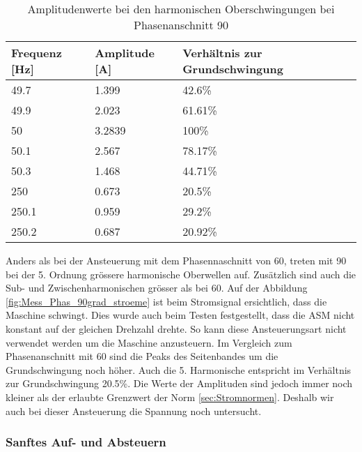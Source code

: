 \begin{table}[ht!]
	\centering
	\begin{tabular}{|l|l|l|}
		\hline
		Frequenz {[}Hz{]} & Amplitude {[}A{]} & Verhältnis zur Grundschwingung	\\ \hline
		49.7              & 1.399             & 42.6\%							\\ \hline
		49.9              & 2.023             & 61.61\%							\\ \hline
		50                & 3.2839            & 100\%							\\ \hline
		50.1              & 2.567             & 78.17\%							\\ \hline
		50.3              & 1.468             & 44.71\%							\\ \hline
		250               & 0.673             & 20.5\%							\\ \hline
		250.1             & 0.959             & 29.2\%							\\ \hline
		250.2             & 0.687             & 20.92\%							\\ \hline
	\end{tabular}
	\caption{Amplitudenwerte bei den harmonischen Oberschwingungen bei Phasenanschnitt 90\textdegree}\label{tab:Phas_90_ASM_stroeme}
\end{table}

Anders als bei der Ansteuerung mit dem Phasennaschnitt von 60\textdegree, treten mit 90\textdegree \hspace{0.02cm} bei der 5. Ordnung grössere harmonische Oberwellen auf. Zusätzlich sind auch die Sub- und Zwischenharmonischen grösser als bei 60\textdegree. Auf der Abbildung \ref{fig:Mess_Phas_90grad_stroeme} ist beim Stromsignal ersichtlich, dass die Maschine schwingt. Dies wurde auch beim Testen festgestellt, dass die ASM nicht konstant auf der gleichen Drehzahl drehte. So kann diese Ansteuerungsart nicht verwendet werden um die Maschine anzusteuern. 
Im Vergleich zum Phasenanschnitt mit 60\textdegree\hspace{0.02cm} sind die Peaks des Seitenbandes um die Grundschwingung noch höher. Auch die 5. Harmonische entspricht im Verhältnis zur Grundschwingung 20.5\%. Die Werte der Amplituden sind jedoch immer noch kleiner als der erlaubte Grenzwert der Norm \ref{sec:Stromnormen}. Deshalb wir auch bei dieser Ansteuerung die Spannung noch untersucht. 



\subsubsection*{Sanftes Auf- und Absteuern}

